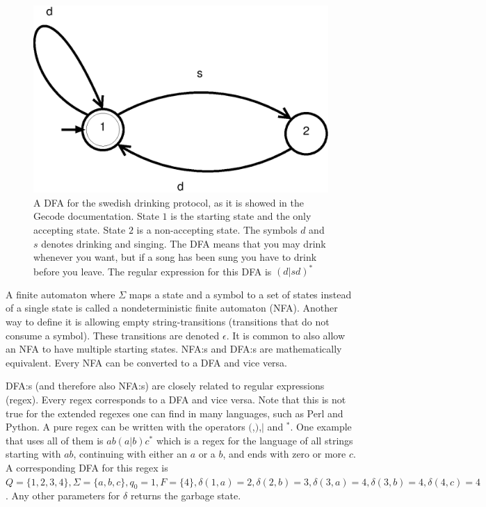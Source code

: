 \documentclass[a4paper,11pt]{article}
\begin{document}
\begin{figure}[H]
\centering
\includegraphics[scale=0.6]{dfa.eps}
\caption{A DFA for the swedish drinking protocol, as it is showed in the Gecode documentation\cite{mpg}. State $1$ is the starting state and the only accepting state. State $2$ is a non-accepting state. The symbols $d$ and $s$ denotes drinking and singing. The DFA means that you may drink whenever you want, but if a song has been sung you have to drink before you leave. The regular expression for this DFA is $(d|sd)^{*}$}
\label{fig:dfasdp}
\end{figure}

A finite automaton where $\Sigma$ maps a state and a symbol to a set of states instead of a single state is called a nondeterministic finite automaton (NFA). Another way to define it is allowing empty string-transitions (transitions that do not consume a symbol). These transitions are denoted $\epsilon$. It is common to also allow an NFA to have multiple starting states. NFA:s and DFA:s are mathematically equivalent. Every NFA can be converted to a DFA and vice versa.

DFA:s (and therefore also NFA:s) are closely related to regular expressions (regex). Every regex corresponds to a DFA and vice versa. Note that this is not true for the extended regexes one can find in many languages, such as Perl and Python. A pure regex can be written with the operators $($,$)$,$|$ and $^{*}$. One example that uses all of them is $ab(a|b)c^{*}$ which is a regex for the language of all strings starting with $ab$, continuing with either an $a$ or a $b$, and ends with zero or more $c$. A corresponding DFA for this regex is $Q=\{1,2,3,4\}, \Sigma=\{a,b,c\}, q_0=1, F=\{4\}, \delta(1,a)=2, \delta(2,b)=3, \delta(3,a)=4, \delta(3,b)=4, \delta(4,c)=4$. Any other parameters for $\delta$ returns the garbage state.
\end{document}

